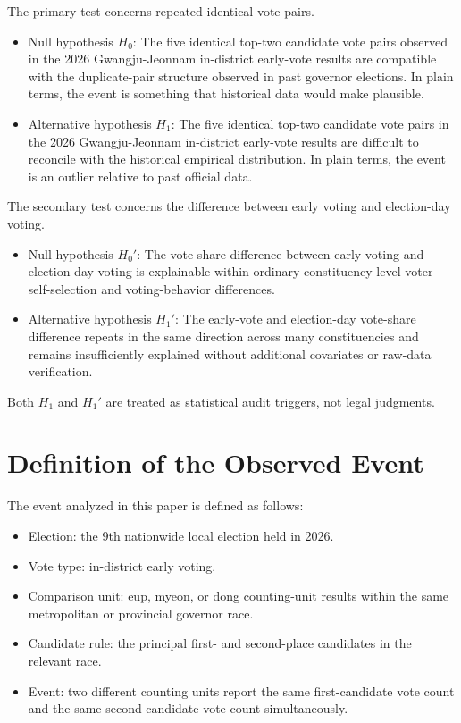 \documentclass[preprint]{../ieie/IEIE}
\begin{document}
The primary test concerns repeated identical vote pairs.

\begin{itemize}
\item Null hypothesis \(H_0\): The five identical top-two candidate vote pairs observed in the 2026 Gwangju-Jeonnam in-district early-vote results are compatible with the duplicate-pair structure observed in past governor elections. In plain terms, the event is something that historical data would make plausible.
\item Alternative hypothesis \(H_1\): The five identical top-two candidate vote pairs in the 2026 Gwangju-Jeonnam in-district early-vote results are difficult to reconcile with the historical empirical distribution. In plain terms, the event is an outlier relative to past official data.
\end{itemize}

The secondary test concerns the difference between early voting and election-day voting.

\begin{itemize}
\item Null hypothesis \(H_0'\): The vote-share difference between early voting and election-day voting is explainable within ordinary constituency-level voter self-selection and voting-behavior differences.
\item Alternative hypothesis \(H_1'\): The early-vote and election-day vote-share difference repeats in the same direction across many constituencies and remains insufficiently explained without additional covariates or raw-data verification.
\end{itemize}

Both \(H_1\) and \(H_1'\) are treated as statistical audit triggers, not legal judgments.

\section{Definition of the Observed Event}

The event analyzed in this paper is defined as follows:

\begin{itemize}
\item Election: the 9th nationwide local election held in 2026.
\item Vote type: in-district early voting.
\item Comparison unit: eup, myeon, or dong counting-unit results within the same metropolitan or provincial governor race.
\item Candidate rule: the principal first- and second-place candidates in the relevant race.
\item Event: two different counting units report the same first-candidate vote count and the same second-candidate vote count simultaneously.
\end{itemize}
\end{document}
